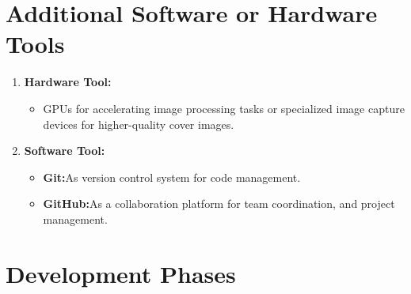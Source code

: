 \section{Additional Software or Hardware Tools}
\begin{enumerate}
    \item \textbf{Hardware Tool:}
    \begin{itemize}
        \item GPUs for accelerating image processing tasks or specialized image capture devices for higher-quality cover images.
    \end{itemize}
    \item \textbf{Software Tool:}
    \begin{itemize}
        \item \textbf{Git:}As version control system for code management.
        \item \textbf{GitHub:}As a collaboration platform  for team coordination, and project management.
    \end{itemize}
\end{enumerate}
    

\section{Development Phases}
